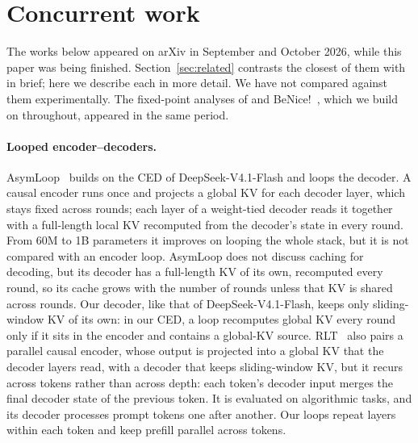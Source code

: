 \makeatletter
\setlength{\@fptop}{0pt}\setlength{\@fpbot}{0pt plus 1fil}
\setlength{\@dblfptop}{0pt}\setlength{\@dblfpbot}{0pt plus 1fil}
\makeatother
\renewcommand{\topfraction}{0.9}\renewcommand{\bottomfraction}{0.8}\renewcommand{\textfraction}{0.05}
\renewcommand{\dbltopfraction}{0.95}\setcounter{dbltopnumber}{3}\setcounter{topnumber}{3}\setcounter{totalnumber}{6}
\renewcommand{\floatpagefraction}{0.85}\renewcommand{\dblfloatpagefraction}{0.85}
\section{Concurrent work}
\label{app:concurrent}

The works below appeared on arXiv in September and October 2026, while this paper was being finished.
Section~\ref{sec:related} contrasts the closest of them with \ourmethod in brief; here we describe each in more
detail. We have not compared against them experimentally. The fixed-point analyses of
\citet{loopsright2} and BeNice!~\citep{benice}, which we build on throughout, appeared in the same period.

\paragraph{Looped encoder--decoders.} AsymLoop~\citep{asymloop} builds on the CED of DeepSeek-V4.1-Flash and
loops the decoder. A causal encoder runs once and projects a global KV for each decoder layer, which stays fixed
across rounds; each layer of a weight-tied decoder reads it together with a full-length local KV recomputed from
the decoder's state in every round. From 60M to 1B parameters it improves on looping the whole stack, but it is
not compared with an encoder loop. AsymLoop does not discuss caching for decoding, but its decoder has a full-length KV of its own, recomputed every round,
so its cache grows with the number of rounds unless that KV is shared across rounds. Our decoder, like that of
DeepSeek-V4.1-Flash, keeps only sliding-window KV of its own: in our CED, a loop recomputes global KV every round
only if it sits in the encoder and contains a global-KV source. RLT~\citep{rlt} also pairs a parallel causal
encoder, whose output is projected into a global KV that the decoder layers read, with a decoder that keeps
sliding-window KV, but it recurs across tokens rather than across depth: each token's decoder input merges the
final decoder state of the previous token. It is evaluated on algorithmic tasks, and its decoder processes prompt
tokens one after another. Our loops repeat layers within each token and keep prefill parallel across tokens.

